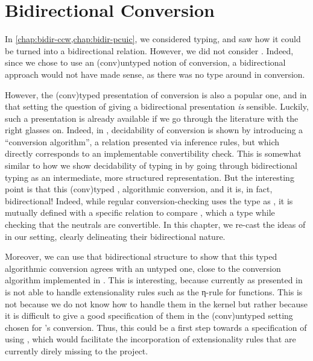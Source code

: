 \chapter{Bidirectional Conversion}
\label{chap:bidir-conv}

In \cref{chap:bidir-ccw,chap:bidir-pcuic}, we considered typing, and saw how it could be
turned into a bidirectional relation. However, we did not consider .
Indeed, since we chose to use an \kl(conv){untyped} notion of conversion, a bidirectional
approach would not have made sense, as there was no type around in conversion.

However, the \kl(conv){typed} presentation of conversion is also a popular one, and in that
setting the question of giving a bidirectional presentation \emph{is} sensible.
Luckily, such a presentation is already available if we go through the literature with the
right glasses on. Indeed, in ,
decidability of conversion is shown by introducing a “conversion algorithm”,
a relation presented via inference rules, but which directly corresponds to
an implementable convertibility check.
This is somewhat similar to how we show decidability of typing
in  by going through bidirectional typing as an intermediate,
more structured representation.
But the interesting point is that this \kl(conv){typed}%
,
algorithmic conversion, and it is, in fact, bidirectional!
Indeed, while regular conversion-checking uses the type as
, it is mutually defined with a specific relation to compare ,
which  a type while checking that the neutrals are convertible.
In this chapter, we re-cast the ideas of \textcite{Abel2017} in our setting,
clearly delineating their bidirectional nature.

Moreover, we can use that bidirectional structure
to show that this typed algorithmic conversion agrees with an untyped one,
close to the conversion algorithm implemented in .
This is interesting, because currently  as presented in 
is not able to handle extensionality rules such as the η-rule for functions.
This is not because we do not know how to handle them in the kernel%
but rather because it is difficult to give a good specification of them in the
\kl(conv){untyped} setting chosen for ’s conversion.%
%
Thus, this could be a first step towards a specification of
 using , which would facilitate the incorporation of
extensionality rules that are currently direly missing to the project.

